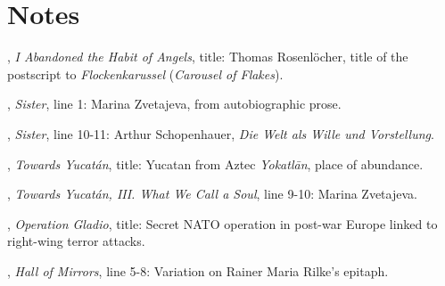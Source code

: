\documentclass[11pt,twoside,final]{memoir}
\begin{document}
\setcounter{chapter}{0}







\chapter{Notes}

\thispagestyle{normalpage}
\normalsize

{\setlength{\parindent}{0pt}
\setlength{\parskip}{\onelineskip}

, \textit{I Abandoned the Habit of Angels}, title: Thomas Rosenlöcher, title of the postscript to \textit{Flockenkarussel} (\textit{Carousel of Flakes}).

, \textit{Sister}, line 1: Marina Zvetajeva, from autobiographic prose.

, \textit{Sister}, line 10-11: Arthur Schopenhauer, \textit{Die Welt als Wille und Vorstellung}.

, \textit{Towards Yucatán}, title: Yucatan from Aztec \textit{Yokatlān}, place of abundance.

, \textit{Towards Yucatán, III. What We Call a Soul}, line 9-10: Marina Zvetajeva.

, \textit{Operation Gladio}, title: Secret NATO operation in post-war Europe linked to right-wing terror attacks.

, \textit{Hall of Mirrors}, line 5-8: Variation on Rainer Maria Rilke's epitaph.

}

\newpage
\thispagestyle{empty}
\mbox{}
\end{document}
